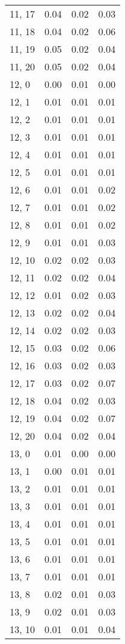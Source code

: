 \begin{table}
\begin{tabular}{llll}
11, 17 &  0.04 &  0.02 &  0.03 \\
11, 18 &  0.04 &  0.02 &  0.06 \\
11, 19 &  0.05 &  0.02 &  0.04 \\
11, 20 &  0.05 &  0.02 &  0.04 \\
12, 0  &  0.00 &  0.01 &  0.00 \\
12, 1  &  0.01 &  0.01 &  0.01 \\
12, 2  &  0.01 &  0.01 &  0.01 \\
12, 3  &  0.01 &  0.01 &  0.01 \\
12, 4  &  0.01 &  0.01 &  0.01 \\
12, 5  &  0.01 &  0.01 &  0.01 \\
12, 6  &  0.01 &  0.01 &  0.02 \\
12, 7  &  0.01 &  0.01 &  0.02 \\
12, 8  &  0.01 &  0.01 &  0.02 \\
12, 9  &  0.01 &  0.01 &  0.03 \\
12, 10 &  0.02 &  0.02 &  0.03 \\
12, 11 &  0.02 &  0.02 &  0.04 \\
12, 12 &  0.01 &  0.02 &  0.03 \\
12, 13 &  0.02 &  0.02 &  0.04 \\
12, 14 &  0.02 &  0.02 &  0.03 \\
12, 15 &  0.03 &  0.02 &  0.06 \\
12, 16 &  0.03 &  0.02 &  0.03 \\
12, 17 &  0.03 &  0.02 &  0.07 \\
12, 18 &  0.04 &  0.02 &  0.03 \\
12, 19 &  0.04 &  0.02 &  0.07 \\
12, 20 &  0.04 &  0.02 &  0.04 \\
13, 0  &  0.01 &  0.00 &  0.00 \\
13, 1  &  0.00 &  0.01 &  0.01 \\
13, 2  &  0.01 &  0.01 &  0.01 \\
13, 3  &  0.01 &  0.01 &  0.01 \\
13, 4  &  0.01 &  0.01 &  0.01 \\
13, 5  &  0.01 &  0.01 &  0.01 \\
13, 6  &  0.01 &  0.01 &  0.01 \\
13, 7  &  0.01 &  0.01 &  0.01 \\
13, 8  &  0.02 &  0.01 &  0.03 \\
13, 9  &  0.02 &  0.01 &  0.03 \\
13, 10 &  0.01 &  0.01 &  0.04 \\

\end{tabular}
\end{table}

